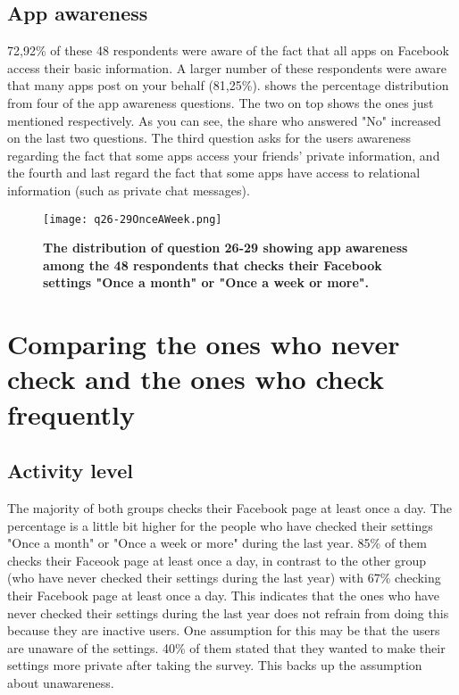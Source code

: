 
\subsection{App awareness}
72,92\% of these 48 respondents were aware of the fact that all apps on Facebook access their basic information. A larger number of these respondents were aware that many apps post on your behalf (81,25\%).  shows the percentage distribution from four of the app awareness questions. The two on top shows the ones just mentioned respectively. As you can see, the share who answered "No" increased on the last two questions. The third question asks for the users awareness regarding the fact that some apps access your friends' private information, and the fourth and last regard the fact that some apps have access to relational information (such as private chat messages).  

\begin{figure}[h!]
\centering
\texttt{[image: q26-29OnceAWeek.png]}
\caption[The distribution of question 26-29 showing app awareness among the 48 respondents that checks their Facebook settings "Once a month" or "Once a week or more"]{\textbf{The distribution of question 26-29 showing app awareness among the 48 respondents that checks their Facebook settings "Once a month" or "Once a week or more".}} 
\label{fig:appawarenessonceaweek}
\end{figure}


\section{Comparing the ones who never check and the ones who check frequently} 

\subsection{Activity level}
The majority of both groups checks their Facebook page at least once a day. The percentage is a little bit higher for the people who have checked their settings "Once a month" or "Once a week or more" during the last year. 85\% of them checks their Faceook page at least once a day, in contrast to the other group (who have never checked their settings during the last year) with 67\% checking their Facebook page at least once a day. This indicates that the ones who have never checked their settings during the last year does not refrain from doing this because they are inactive users. One assumption for this may be that the users are unaware of the settings. 40\% of them stated that they wanted to make their settings more private after taking the survey. This backs up the assumption about unawareness.  


